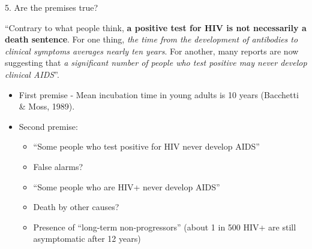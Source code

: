 \documentclass{beamer}
\begin{document}



\begin{frame}{5. Are the premises true?}

	``Contrary to what people think, \textbf{a positive test for HIV is not necessarily a death sentence}. For one thing, \emph{the time from the development of antibodies to clinical symptoms averages nearly ten years}. For another, many reports are now suggesting that \emph{a significant number of people who test positive may never develop clinical AIDS}''.

\begin{itemize}
\item First premise - Mean incubation time in young adults is 10 years (Bacchetti \& Moss, 1989).
\item Second premise:
\begin{itemize}
\item ``Some people who test positive for HIV never develop AIDS''
\item False alarms?
\item ``Some people who are HIV+ never develop AIDS''
\item Death by other causes?
\item Presence of ``long-term non-progressors'' (about 1 in 500 HIV+ are still asymptomatic after 12 years)
\end{itemize}
\end{itemize}
\end{frame}



\end{document}
